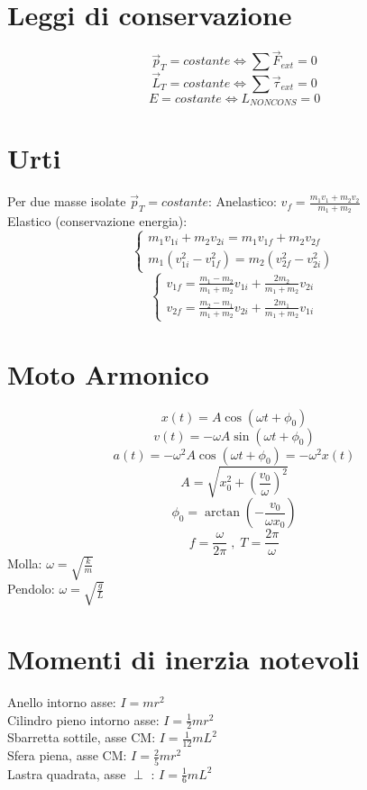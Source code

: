 \documentclass{article}
\begin{document}
\begin{small}
\begin{multicols}{3}
\section{Leggi di conservazione}
		\[ \vec p_T = costante \Leftrightarrow \sum \vec F_{ext} = 0 \]
		\[ \vec L_T = costante \Leftrightarrow \sum \vec \tau_{ext} = 0 \]
		\[ E = costante \Leftrightarrow L_{NON CONS} = 0 \]
\section{Urti}
		Per due masse isolate $ \vec p_T = costante $:
		Anelastico: $ v_f = \frac{ m_1 v_1 + m_2 v_2 }{ m_1 + m_2 } $ \\
		Elastico (conservazione energia):
		\[ \begin{cases} m_1 v_{1i} + m_2 v_{2i} = m_1 v_{1f} + m_2 v_{2f}
		\\ m_1 ( v_{1i}^2 - v_{1f}^2 ) = m_2 ( v_{2f}^2 - v_{2i}^2 ) \end{cases} \]
		\[ \begin{cases} v_{1f} = \frac{ m_1 - m_2 }{ m_1 + m_2 } v_{1i} + \frac{ 2 m_2 }{ m_1 + m_2 } v_{2i}
		\\ v_{2f} = \frac{ m_2 - m_1 }{ m_1 + m_2 } v_{2i} + \frac{ 2 m_1 }{ m_1 + m_2 } v_{1i} \end{cases} \]
\section{Moto Armonico}
		\[ x ( t ) = A \cos ( \omega t + \phi_0 ) \]
		\[ v ( t ) = - \omega A \sin ( \omega t + \phi_0 ) \]
		\[ a ( t ) = - \omega^2 A \cos ( \omega t + \phi_0 ) = - \omega^2 x( t ) \]
		\[ A = \sqrt{ x_0^2 + \left ( \frac{ v_0 }{ \omega } \right )^2 } \]
		\[ \phi_0 = \arctan \left ( - \frac{ v_0 }{ \omega x_0 } \right ) \]
		\[ f = \frac{ \omega }{ 2 \pi } \;,\; T = \frac{ 2 \pi }{ \omega } \]
		Molla: $ \omega = \sqrt{ \frac{ k }{ m } } $ \\
		Pendolo: $ \omega = \sqrt{ \frac{ g }{ L } } $
\section{Momenti di inerzia notevoli}
		Anello intorno asse: $ I = m r^2 $ \\
		Cilindro pieno intorno asse: $ I = \frac{1}{2} m r^2 $ \\
		Sbarretta sottile, asse CM: $ I = \frac{1}{ 12 } m L^2 $ \\
		Sfera piena, asse CM: $ I = \frac{ 2 }{ 5 } m r^2 $ \\
		Lastra quadrata, asse $\perp$ : $ I = \frac{1}{ 6 } m L^2 $

\end{multicols}
\end{small}
\end{document}
